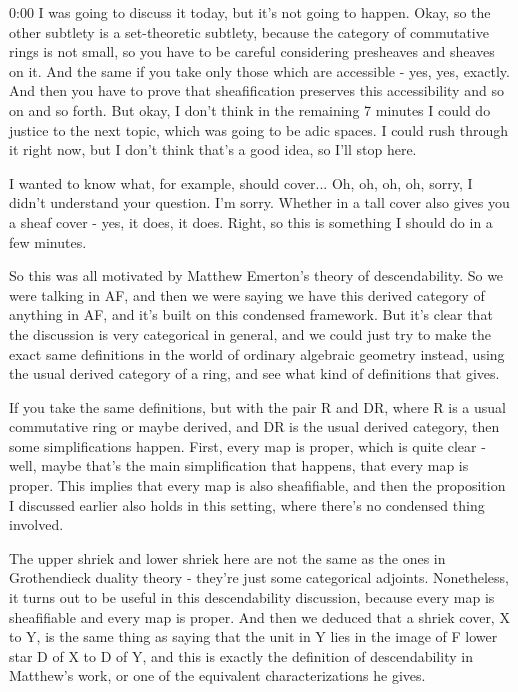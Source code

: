 \begin{unfinished}{0:00}
I was going to discuss it today, but it's not going to happen. Okay, so the other subtlety is a set-theoretic subtlety, because the category of commutative rings is not small, so you have to be careful considering presheaves and sheaves on it. And the same if you take only those which are accessible - yes, yes, exactly. And then you have to prove that sheafification preserves this accessibility and so on and so forth. But okay, I don't think in the remaining 7 minutes I could do justice to the next topic, which was going to be adic spaces. I could rush through it right now, but I don't think that's a good idea, so I'll stop here.

I wanted to know what, for example, should cover... Oh, oh, oh, oh, sorry, I didn't understand your question. I'm sorry. Whether in a tall cover also gives you a sheaf cover - yes, it does, it does. Right, so this is something I should do in a few minutes.

So this was all motivated by Matthew Emerton's theory of descendability. So we were talking in AF, and then we were saying we have this derived category of anything in AF, and it's built on this condensed framework. But it's clear that the discussion is very categorical in general, and we could just try to make the exact same definitions in the world of ordinary algebraic geometry instead, using the usual derived category of a ring, and see what kind of definitions that gives.

If you take the same definitions, but with the pair R and DR, where R is a usual commutative ring or maybe derived, and DR is the usual derived category, then some simplifications happen. First, every map is proper, which is quite clear - well, maybe that's the main simplification that happens, that every map is proper. This implies that every map is also sheafifiable, and then the proposition I discussed earlier also holds in this setting, where there's no condensed thing involved.

The upper shriek and lower shriek here are not the same as the ones in Grothendieck duality theory - they're just some categorical adjoints. Nonetheless, it turns out to be useful in this descendability discussion, because every map is sheafifiable and every map is proper. And then we deduced that a shriek cover, X to Y, is the same thing as saying that the unit in Y lies in the image of F lower star D of X to D of Y, and this is exactly the definition of descendability in Matthew's work, or one of the equivalent characterizations he gives.


\end{unfinished}
